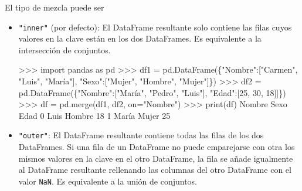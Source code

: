 \documentclass[
  spanish,
  a4paper,
]{scrreport}
\newenvironment{Shaded}{\begin{snugshade}}{\end{snugshade}}
\newcommand{\BuiltInTok}[1]{\textcolor[rgb]{0.00,0.23,0.31}{#1}}
\newcommand{\DecValTok}[1]{\textcolor[rgb]{0.68,0.00,0.00}{#1}}
\newcommand{\ImportTok}[1]{\textcolor[rgb]{0.00,0.46,0.62}{#1}}
\newcommand{\NormalTok}[1]{\textcolor[rgb]{0.00,0.23,0.31}{#1}}
\newcommand{\OperatorTok}[1]{\textcolor[rgb]{0.37,0.37,0.37}{#1}}
\newcommand{\StringTok}[1]{\textcolor[rgb]{0.13,0.47,0.30}{#1}}
\begin{document}
El tipo de mezcla puede ser

\begin{itemize}
\item
  \texttt{"inner"} (por defecto): El DataFrame resultante solo contiene
  las filas cuyos valores en la clave están en los dos DataFrames. Es
  equivalente a la intersección de conjuntos.

\begin{Shaded}
\begin{Highlighting}[]
\OperatorTok{\textgreater{}\textgreater{}\textgreater{}} \ImportTok{import}\NormalTok{ pandas }\ImportTok{as}\NormalTok{ pd}
\OperatorTok{\textgreater{}\textgreater{}\textgreater{}}\NormalTok{ df1 }\OperatorTok{=}\NormalTok{ pd.DataFrame(\{}\StringTok{"Nombre"}\NormalTok{:[}\StringTok{"Carmen"}\NormalTok{, }\StringTok{"Luis"}\NormalTok{, }\StringTok{"María"}\NormalTok{],  }\StringTok{"Sexo"}\NormalTok{:[}\StringTok{"Mujer"}\NormalTok{, }\StringTok{"Hombre"}\NormalTok{, }\StringTok{"Mujer"}\NormalTok{]\})}
\OperatorTok{\textgreater{}\textgreater{}\textgreater{}}\NormalTok{ df2 }\OperatorTok{=}\NormalTok{ pd.DataFrame(\{}\StringTok{"Nombre"}\NormalTok{:[}\StringTok{"María"}\NormalTok{, }\StringTok{"Pedro"}\NormalTok{, }\StringTok{"Luis"}\NormalTok{], }\StringTok{"Edad"}\NormalTok{:[}\DecValTok{25}\NormalTok{, }\DecValTok{30}\NormalTok{, }\DecValTok{18}\NormalTok{]]\})}
\OperatorTok{\textgreater{}\textgreater{}\textgreater{}}\NormalTok{ df }\OperatorTok{=}\NormalTok{ pd.merge(df1, df2, on}\OperatorTok{=}\StringTok{"Nombre"}\NormalTok{)}
\OperatorTok{\textgreater{}\textgreater{}\textgreater{}} \BuiltInTok{print}\NormalTok{(df)}
\NormalTok{  Nombre    Sexo  Edad}
\DecValTok{0}\NormalTok{   Luis  Hombre    }\DecValTok{18}
\DecValTok{1}\NormalTok{  María   Mujer    }\DecValTok{25}
\end{Highlighting}
\end{Shaded}
\item
  \texttt{"outer"}: El DataFrame resultante contiene todas las filas de
  los dos DataFrames. Si una fila de un DataFrame no puede emparejarse
  con otra los mismos valores en la clave en el otro DataFrame, la fila
  se añade igualmente al DataFrame resultante rellenando las columnas
  del otro DataFrame con el valor \texttt{NaN}. Es equivalente a la
  unión de conjuntos.


\end{itemize}
\end{document}
